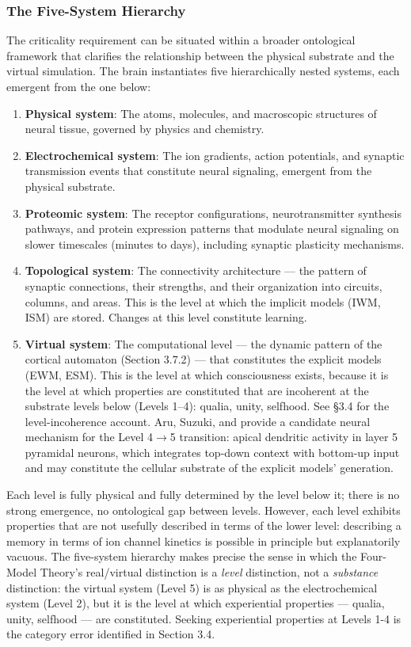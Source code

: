 \documentclass[12pt]{article}
\begin{document}
\subsubsection{The Five-System Hierarchy}

The criticality requirement can be situated within a broader ontological framework that clarifies the relationship between the physical substrate and the virtual simulation. The brain instantiates five hierarchically nested systems, each emergent from the one below:

\begin{enumerate}
\item \textbf{Physical system}: The atoms, molecules, and macroscopic structures of neural tissue, governed by physics and chemistry.
\item \textbf{Electrochemical system}: The ion gradients, action potentials, and synaptic transmission events that constitute neural signaling, emergent from the physical substrate.
\item \textbf{Proteomic system}: The receptor configurations, neurotransmitter synthesis pathways, and protein expression patterns that modulate neural signaling on slower timescales (minutes to days), including synaptic plasticity mechanisms.
\item \textbf{Topological system}: The connectivity architecture --- the pattern of synaptic connections, their strengths, and their organization into circuits, columns, and areas. This is the level at which the implicit models (IWM, ISM) are stored. Changes at this level constitute learning.
\item \textbf{Virtual system}: The computational level --- the dynamic pattern of the cortical automaton (Section 3.7.2) --- that constitutes the explicit models (EWM, ESM). This is the level at which consciousness exists, because it is the level at which properties are constituted that are incoherent at the substrate levels below (Levels 1--4): qualia, unity, selfhood. See \S3.4 for the level-incoherence account. Aru, Suzuki, and \citet{AruSuzukiLarkum2020} provide a candidate neural mechanism for the Level 4$\rightarrow$5 transition: apical dendritic activity in layer 5 pyramidal neurons, which integrates top-down context with bottom-up input and may constitute the cellular substrate of the explicit models' generation.
\end{enumerate}

Each level is fully physical and fully determined by the level below it; there is no strong emergence, no ontological gap between levels. However, each level exhibits properties that are not usefully described in terms of the lower level: describing a memory in terms of ion channel kinetics is possible in principle but explanatorily vacuous. The five-system hierarchy makes precise the sense in which the Four-Model Theory's real/virtual distinction is a \emph{level} distinction, not a \emph{substance} distinction: the virtual system (Level 5) is as physical as the electrochemical system (Level 2), but it is the level at which experiential properties --- qualia, unity, selfhood --- are constituted. Seeking experiential properties at Levels 1-4 is the category error identified in Section 3.4.
\end{document}
